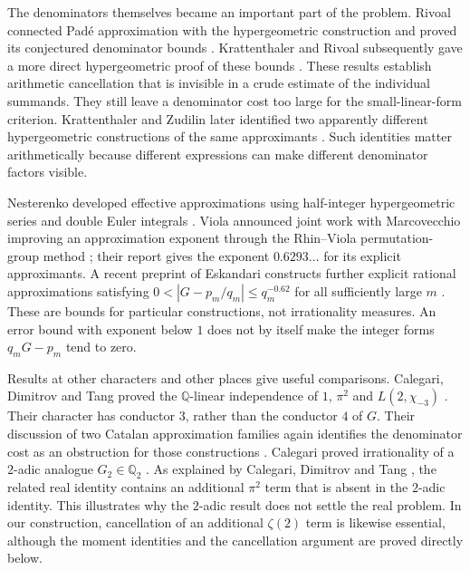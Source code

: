 The denominators themselves became an important part of the problem.
Rivoal connected Pad\'e approximation with the hypergeometric
construction and proved its conjectured denominator bounds
\cite[Theorems~1 and~2]{Rivoal2006Catalan}.
Krattenthaler and Rivoal subsequently gave a more direct hypergeometric
proof of these bounds \cite[Theorems~1 and~2]{KrattenthalerRivoal2008Catalan}.
These results establish arithmetic cancellation that is invisible in
a crude estimate of the individual summands. They still leave a
denominator cost too large for the small-linear-form criterion.
Krattenthaler and Zudilin later identified two apparently different
hypergeometric constructions of the same approximants
\cite[Section~2 and Theorem~2]{KrattenthalerZudilin2019}.
Such identities matter arithmetically because different expressions can
make different denominator factors visible.

Nesterenko developed effective approximations using half-integer
hypergeometric series and double Euler integrals
\cite{Nesterenko2016Catalan}.
Viola announced joint work with Marcovecchio improving an approximation
exponent through the Rhin--Viola permutation-group method
\cite{Viola2022Catalan}; their report gives the exponent $0.6293\ldots$
for its explicit approximants. A recent preprint of Eskandari constructs
further explicit rational approximations satisfying
$0<|G-p_m/q_m|\le q_m^{-0.62}$ for all sufficiently large $m$
\cite[Theorem~1.1]{Eskandari2026Approximations}.
These are bounds for particular constructions, not irrationality
measures. An error bound with exponent below $1$ does not by itself
make the integer forms $q_mG-p_m$ tend to zero.

Results at other characters and other places give useful comparisons.
Calegari, Dimitrov and Tang proved the $\mathbb Q$-linear independence
of $1$, $\pi^2$ and $L(2,\chi_{-3})$
\cite[Theorem~A]{CalegariDimitrovTang2024}.
Their character has conductor $3$, rather than the conductor $4$ of $G$.
Their discussion of two Catalan approximation families again identifies
the denominator cost as an obstruction for those constructions
\cite[Remark~11.1.17]{CalegariDimitrovTang2024}.
Calegari proved irrationality of a $2$-adic analogue
$G_2\in\mathbb Q_2$ \cite[Theorem~4.2]{Calegari2005}.
As explained by Calegari, Dimitrov and Tang
\cite[Section~5.2, footnote~2]{CalegariDimitrovTang2025}, the related
real identity contains an additional $\pi^2$ term that is absent in
the $2$-adic identity. This illustrates why the $2$-adic result does
not settle the real problem. In our construction, cancellation of an
additional $\zeta(2)$ term is likewise essential, although the moment
identities and the cancellation argument are proved directly below.

